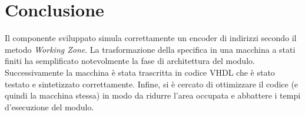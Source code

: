 \section{Conclusione}
Il componente sviluppato simula correttamente un encoder di indirizzi secondo il metodo \textit{Working Zone}.\newline
La trasformazione della specifica in una macchina a stati finiti ha semplificato notevolmente la fase di architettura del modulo.\newline
Successivamente la macchina è stata trascritta in codice VHDL che è stato testato e sintetizzato correttamente.\newline
Infine, si è cercato di ottimizzare il codice (e quindi la macchina stessa) in modo da ridurre l'area occupata e abbattere i tempi d'esecuzione del modulo.